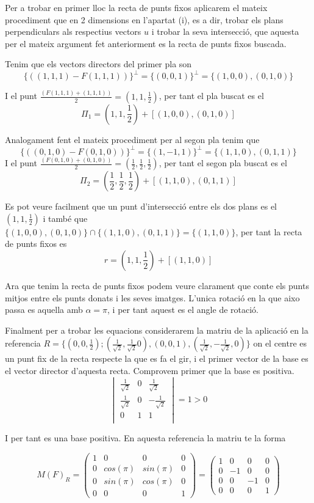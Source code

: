\documentclass[12pt, a4papre]{article}
\begin{document}
	Per a trobar en primer lloc la recta de punts fixos aplicarem el mateix procediment que en 2 dimensions en l'apartat (i), es a dir, trobar els plans perpendiculars als respectius vectors
	$u$ i trobar la seva intersecció, que aquesta per el mateix argument fet anteriorment es la recta de punts fixos buscada.
	
	Tenim que els vectors directors del primer pla son 
	\[
	\{((1,1,1)-F(1,1,1))\}^\perp=\{(0,0,1)\}^\perp=\{(1,0,0),(0,1,0)\}
	\]
	
	I el punt $\frac{(F(1,1,1)+(1,1,1))}{2}=(1,1,\frac{1}{2})$, per tant el pla buscat es el 
	\[
	\Pi_1=(1,1,\frac{1}{2}) + [(1,0,0),(0,1,0)]
	\]
	
	Analogament fent el mateix procediment per al segon pla tenim que
	\[
	\{((0,1,0)-F(0,1,0))\}^\perp=\{(1,-1,1)\}^\perp=\{(1,1,0),(0,1,1)\}
	\]
	I el punt $\frac{(F(0,1,0)+(0,1,0))}{2}=(\frac{1}{2},\frac{1}{2},\frac{1}{2})$, per tant el segon pla buscat es el 
	\[
	\Pi_2=(\frac{1}{2},\frac{1}{2},\frac{1}{2}) + [(1,1,0),(0,1,1)]
	\]
	
	Es pot veure facilment que un punt d'intersecció entre els dos plans es el $(1,1,\frac{1}{2})$ i també que $\{(1,0,0),(0,1,0)\}\cap \{(1,1,0),(0,1,1)\}=\{(1,1,0)\}$, per tant
	la recta de punts fixos es
	\[
	r=(1,1,\frac{1}{2})+[(1,1,0)]
	\]
	
	Ara que tenim la recta de punts fixos podem veure clarament que conte els punts mitjos entre els punts donats i les seves imatges. L'unica rotació en la que aixo passa
	es aquella amb $\alpha=\pi$, i per tant aquest es el angle de rotació.
	
	Finalment per a trobar les equacions considerarem la matriu de la aplicació en la referencia $R=\{(0,0,\frac{1}{2}); (\frac{1}{\sqrt{2}}, \frac{1}{\sqrt{2}} 0), (0,0,1), (\frac{1}{\sqrt{2}} , -\frac{1}{\sqrt{2}} , 0)\}$
	on el centre es un punt fix de la recta respecte la que es fa el gir, i el primer vector de la base es el vector director d'aquesta recta. Comprovem primer que la base es positiva.
	\[
	\begin{vmatrix}
		\frac{1}{\sqrt{2}} 	&	0	&	\frac{1}{\sqrt{2}}\\
		\frac{1}{\sqrt{2}} 	&	0	&	-\frac{1}{\sqrt{2}}\\
		0				&	1  	&	1\\
	\end{vmatrix}
	= 1 > 0
	\]
	
	I per tant es una base positiva. En aquesta referencia la matriu te la forma
	
	\[
	M(F)_R=
	\begin{pmatrix}
		1	&	0		&	0		&	0\\
		0	&	cos(\pi)	&	sin(\pi)	&	0\\
		0	&	sin(\pi) 	&	cos(\pi)	&	0\\
		0	&	0		& 	0		&	1
	\end{pmatrix}
	= 
	\begin{pmatrix}
		1	&	0	&	0	&	0\\
		0	&	-1	&	0	&	0\\
		0	&	0  	&	-1	&	0\\
		0	&	0	& 	0	&	1
	\end{pmatrix}
	\]
	
\end{document}
